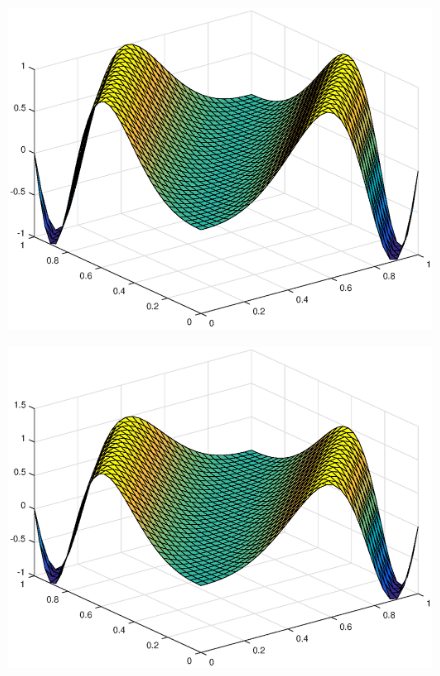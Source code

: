 \documentclass[main.tex]{subfiles}
\begin{document}
\begin{figure}[h]
\centering
\begin{minipage}{.3\textwidth}
  \centering
  \includegraphics[width=.9\linewidth]{../Figures/ex2u2exact}
  \label{fig:ex2:u2exact}
\end{minipage}\hfill%
\begin{minipage}{.3\textwidth}
  \centering
  \includegraphics[width=.9\linewidth]{../Figures/ex2u2calc}
  \label{fig:ex2:u2calc}
\end{minipage}\hfill%
\begin{minipage}{.3\textwidth}
  \centering

\end{minipage}
\end{figure}
\end{document}
